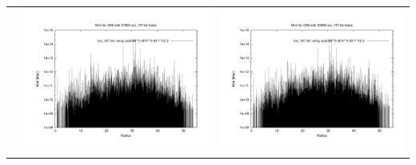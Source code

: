 \begin{itemize}
\begin{table}[p]
\begin{tabular}{l|c|c}
 & \includegraphics[scale=0.25]{r256/h70/red_st14_log1/plot_mvir_out_197.pdf} & \includegraphics[scale=0.25]{r256/h100/red_st14_log1/plot_mvir_out_197.pdf} \\

\end{tabular}
\end{table}
\end{itemize}
